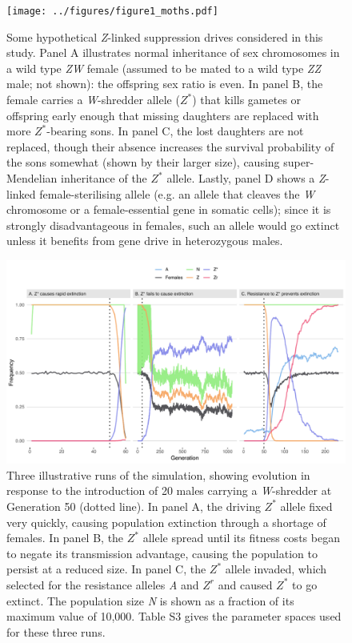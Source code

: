 \documentclass[]{rsos}%
\begin{document}
\begin{figure}[h]
\centering
\texttt{[image: ../figures/figure1\_moths.pdf]}
\caption{\footnotesize{Some hypothetical \textit{Z}-linked suppression drives considered in this study. Panel A illustrates normal inheritance of sex chromosomes in a wild type \textit{ZW} female (assumed to be mated to a wild type \textit{ZZ} male; not shown): the offspring sex ratio is even. In panel B, the female carries a \textit{W}-shredder allele ($Z^*$) that kills gametes or offspring early enough that missing daughters are replaced with more $Z^*$-bearing sons. In panel C, the lost daughters are not replaced, though their absence increases the survival probability of the sons somewhat (shown by their larger size), causing super-Mendelian inheritance of the $Z^*$ allele. Lastly, panel D shows a \textit{Z}-linked female-sterilising allele (e.g. an allele that cleaves the \textit{W} chromosome or a female-essential gene in somatic cells); since it is strongly disadvantageous in females, such an allele would go extinct unless it benefits from gene drive in heterozygous males.}}
\end{figure}
\newpage

\begin{figure}[h]
\centering
\includegraphics[width=1.0\textwidth]{../figures/figure2.pdf}
\caption{\footnotesize{Three illustrative runs of the simulation, showing evolution in response to the introduction of 20 males carrying a \textit{W}-shredder at Generation 50 (dotted line). In panel A, the driving $Z^*$ allele fixed very quickly, causing population extinction through a shortage of females. In panel B, the $Z^*$ allele spread until its fitness costs began to negate its transmission advantage, causing the population to persist at a reduced size. In panel C, the $Z^*$ allele invaded, which selected for the resistance alleles \textit{A} and $Z^r$ and caused $Z^*$ to go extinct. The population size \textit{N} is shown as a fraction of its maximum value of 10,000. Table S3 gives the parameter spaces used for these three runs.}}
\end{figure}
\newpage
\end{document}
